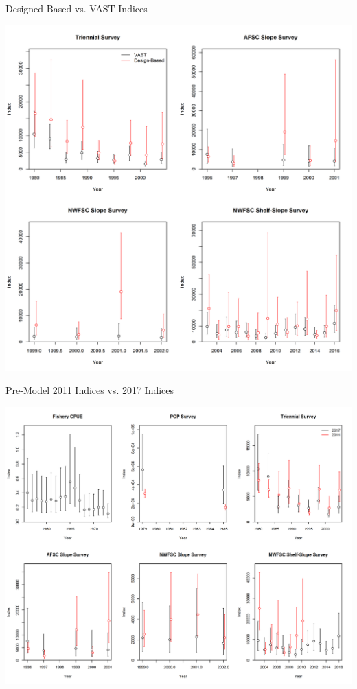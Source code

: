 \documentclass[pdf]{beamer}\usepackage[]{graphicx}\usepackage[]{color}
\begin{document}
\begin{frame}{Designed Based vs. VAST Indices}
  \begin{center}
    \includegraphics[scale = 0.30]{figures/Index_DesignBased_Comparison.png}
  \end{center}
\end{frame} 

\begin{frame}{Pre-Model 2011 Indices vs. 2017 Indices}
  \begin{center}
    \includegraphics[scale = 0.35]{figures/Index_Compare_2011_2017.png}
  \end{center}
\end{frame} 
\end{document}
